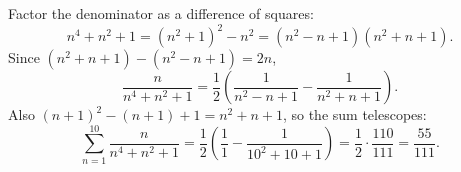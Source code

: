 Factor the denominator as a difference of squares:
\[n^4+n^2+1=\left(n^2+1\right)^2-n^2=\left(n^2-n+1\right)\left(n^2+n+1\right).\]
Since $\left(n^2+n+1\right)-\left(n^2-n+1\right)=2n$,
\[\dfrac{n}{n^4+n^2+1}=\dfrac12\left(\dfrac{1}{n^2-n+1}-\dfrac{1}{n^2+n+1}\right).\]
Also $(n+1)^2-(n+1)+1=n^2+n+1$, so the sum telescopes:
\[\sum_{n=1}^{10}\dfrac{n}{n^4+n^2+1}=\dfrac12\left(\dfrac{1}{1}-\dfrac{1}{10^2+10+1}\right)=\dfrac12\cdot\dfrac{110}{111}=\boxed{\dfrac{55}{111}}.\]
